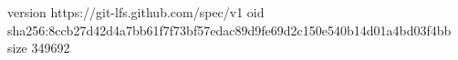 version https://git-lfs.github.com/spec/v1
oid sha256:8ccb27d42d4a7bb61f7f73bf57edac89d9fe69d2c150e540b14d01a4bd03f4bb
size 349692
